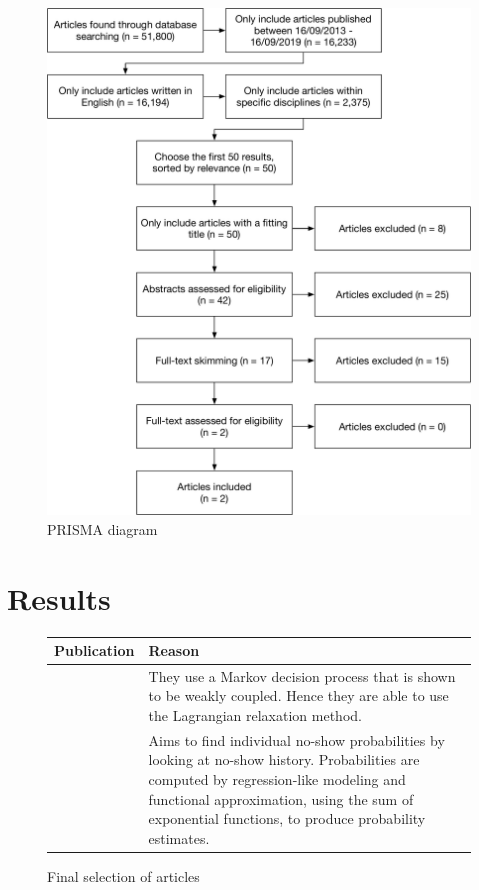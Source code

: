 \documentclass[a4paper,12pt]{article}
\begin{document}
\begin{figure}[H]
    \begin{center}
    \includegraphics[scale=0.5]{PRISMA.pdf}
    \end{center}
    \caption{PRISMA diagram}
    \label{prisma}
\end{figure}

\section*{Results}

\begin{figure}[H]
    \begin{table}[H]
    \begin{tabularx}{\textwidth}{@{} c Y @{}}
    \toprule
    Publication & Reason \\ \midrule
    \cite{BD29}        &    They use a Markov decision process that is shown to be weakly coupled. Hence they are able to use the Lagrangian relaxation method. \\
    \cite{BD25}        &    Aims to find individual no-show probabilities by looking at no-show history. Probabilities are computed by regression-like modeling and functional approximation, using the sum of exponential functions, to produce probability estimates. \\
    \bottomrule
    \end{tabularx}
    \end{table}
    \caption{Final selection of articles}
    \label{good}
\end{figure}
\end{document}
